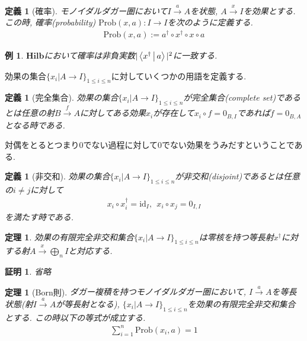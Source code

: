 \documentclass[a4paper,12pt]{ltjsarticle}
\theoremstyle{break}
\newtheorem{defn}[thm]{定義}
\newtheorem{thrm}[thm]{定理}
\newtheorem{eg}[thm]{例}
\newtheorem*{prf}{証明}
\newcommand{\hilb}{\mathbf{Hilb}}
\newcommand{\prob}{\mathrm{Prob}}
\newcommand{\xr}[1]{\xrightarrow{#1}}
\newcommand{\id}{\mathrm{id}}
\newcommand{\ci}{\circ}
\newcommand{\da}{\dagger}
\newcommand{\bigop}{\bigoplus}
\numberwithin{equation}{section}
\begin{document}
\begin{defn}[確率]
  モノイダルダガー圏において$I \xr{a} A$を状態, $A \xr{x} I$を効果とする. 
  この時, 確率(probability) $\prob(x,a): I \to I$を次のように定義する.
  \begin{align*}
    \prob(x,a) := a^\da \ci x^\da \ci x \ci a 
  \end{align*} 
\end{defn}

\begin{eg}
  $\hilb$において確率は非負実数$|\Braket{x^\da|a}|^2$に一致する. 
\end{eg}

効果の集合$\{x_i | A \to I\}_{1 \leq i \leq n}$に対していくつかの用語を定義する. 

\begin{defn}[完全集合]
  効果の集合$\{x_i | A \to I\}_{1 \leq i \leq n}$が完全集合(complete set)であるとは任意の射$B \xr{f} A$に対してある効果$x_i$が存在して$x_i \ci f = 0_{B,I}$であれば$f = 0_{B,A}$となる時である. 
\end{defn}

対偶をとるとつまり$0$でない過程に対して$0$でない効果をうみだすということである. 

\begin{defn}[非交和]
  効果の集合$\{x_i | A \to I\}_{1 \leq i \leq n}$が非交和(disjoint)であるとは任意の$i \neq j$に対して
  \begin{align*}
    x_i \ci x_i^\da = \id_I, ~~ x_i \ci x_j = 0_{I,I} 
  \end{align*}
  を満たす時である. 
\end{defn}

\begin{thrm}
  効果の有限完全非交和集合$\{x_i | A \to I\}_{1 \leq i \leq n}$は零核を持つ等長射$x^\da$に対する射$A \xr{x} \bigop_n I$と対応する. 
\end{thrm}

\begin{prf}
  省略
\end{prf}

\begin{thrm}[Born則]
  ダガー複積を持つモノイダルダガー圏において, $I \xr{a} A$を等長状態(射$I \xr{a} A$が等長射となる), $\{x_i | A \to I\}_{1 \leq i \leq n}$を効果の有限完全非交和集合とする. 
  この時以下の等式が成立する. 　
　\begin{align*}
    \sum_{i=1}^n \prob(x_i,a)=1
  \end{align*}
\end{thrm}
\end{document}
